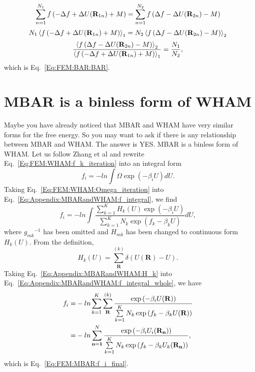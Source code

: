 \begin{appendices}
\begin{equation}
\end{equation}
\begin{equation}
\sum\limits_{n=1}^{N_1}f\left(-\Delta f+\Delta U(\mathbf{R}_{1n})+M\right)=\sum\limits_{n=1}^{N_2} f\left(\Delta f-\Delta U(\mathbf{R}_{2n})-M\right)\notag
\end{equation}
\begin{equation}
N_1\left<f\left(-\Delta f+\Delta U(\mathbf{R}_{1n})+M\right)\right>_1=N_2\left<f\left(\Delta f-\Delta U(\mathbf{R}_{2n})-M\right)\right>_2\notag
\end{equation}
\begin{equation}
\frac{\left<f\left(\Delta f-\Delta U(\mathbf{R}_{2n})-M\right)\right>_2}{\left<f\left(-\Delta f+\Delta U(\mathbf{R}_{1n})+M\right)\right>_1}=\frac{N_1}{N_2},\notag
\end{equation}
which is Eq.~\ref{Eq:FEM:BAR:BAR}.

\chapter{MBAR is a binless form of WHAM\label{chapter:Appendix:MBARandWHAM}}
Maybe you have already noticed that MBAR and WHAM have very similar forms for the free energy. 
So you may want to ask if there is any relationship between MBAR and WHAM. The answer is YES. 
MBAR is a binless form of WHAM.\cite{TanJCP2012} Let us follow Zhang et al\cite{ZhangMS2016} 
and rewrite Eq.~\ref{Eq:FEM:WHAM:f_k_iteration} into an integral form
\begin{equation}
f_i=-ln\int\Omega\exp{(-\beta_iU)}dU.
\label{Eq:Appendix:MBARandWHAM:f_integral}
\end{equation}
Taking Eq.~\ref{Eq:FEM:WHAM:Omega_iteration} into Eq.~\ref{Eq:Appendix:MBARandWHAM:f_integral}, we find
\begin{equation}
f_i=-ln\int\frac{\sum\limits_{k=1}^{K}H_k(U)\exp{(-\beta_iU)}}{\sum\limits_{k=1}^{K}N_k\exp{(f_k-\beta_kU)}}dU,
\label{Eq:Appendix:MBARandWHAM:f_integral_whole}
\end{equation}
where ${g_{mk}}^{-1}$ has been omitted and $H_{mk}$ has been changed to continuous form $H_k(U)$. From the definition,
\begin{equation}
H_k(U)=\sum\limits_{\mathbf{R}}^{(k)}\delta (U(\mathbf{R})-U).
\label{Eq:Appendix:MBARandWHAM:H_k}
\end{equation}
Taking Eq.~\ref{Eq:Appendix:MBARandWHAM:H_k} into Eq.~\ref{Eq:Appendix:MBARandWHAM:f_integral_whole}, we have
\begin{align}
f_i=&-ln\sum\limits_{k=1}^{K}\sum\limits_{\mathbf{R}}^{(k)}\frac{\exp{(-\beta_iU(\mathbf{R}))}}{\sum\limits_{k=1}^{K}N_k\exp{(f_k-\beta_kU(\mathbf{R}))}}\notag\\
   =&-ln\sum\limits_{\mathbf{n=1}}^{N}\frac{\exp{(-\beta_iU_i(\mathbf{R_n}))}}{\sum\limits_{k=1}^{K}N_k\exp{(f_k-\beta_kU_k(\mathbf{R_n}))}},
\end{align}
which is Eq.~\ref{Eq:FEM:MBAR:f_i_final}.

\end{appendices}
